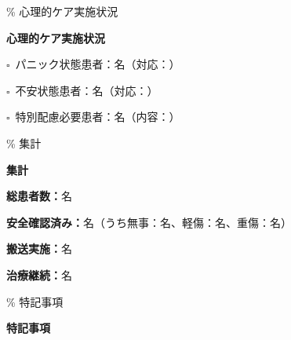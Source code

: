 \documentclass[
  japanese,
]{jarticle}
\newcommand{\checkbox}{$\square$\ }
\newcommand{\underlinespace}[1]{\underline{\hspace{#1}}}
\begin{document}
\% 心理的ケア実施状況

\textbf{\large 心理的ケア実施状況}

\checkbox パニック状態患者：\underlinespace{2cm}名（対応：\underlinespace{6cm}）

\checkbox 不安状態患者：\underlinespace{2cm}名（対応：\underlinespace{6cm}）

\checkbox 特別配慮必要患者：\underlinespace{2cm}名（内容：\underlinespace{6cm}）

\% 集計

\textbf{\large 集計}

\textbf{総患者数：}\underlinespace{2cm}名

\textbf{安全確認済み：}\underlinespace{2cm}名（うち無事：\underlinespace{1.5cm}名、軽傷：\underlinespace{1.5cm}名、重傷：\underlinespace{1.5cm}名）

\textbf{搬送実施：}\underlinespace{2cm}名

\textbf{治療継続：}\underlinespace{2cm}名

\% 特記事項

\textbf{\large 特記事項}

\underlinespace{13cm}

\underlinespace{13cm}

\underlinespace{13cm}

\underlinespace{13cm}

\underlinespace{13cm}
\end{document}
